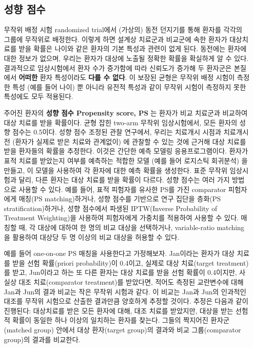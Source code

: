 \documentclass[11pt]{book}
\theoremstyle{definition}
\theoremstyle{definition}
\theoremstyle{definition}
\theoremstyle{remark}
\begin{document}
\subsection{성향 점수}\label{-}


무작위 배정 시험 randomized trial에서 (가상의) 동전 던지기를 통해 환자를
각각의 그룹에 무작위로 배정한다. 이렇게 하면 설계상 치료군과 비교군에
속한 환자가 대상치료를 받을 확률은 나이와 같은 환자의 기본 특성과 관련이
없게 된다. 동전에는 환자에 대한 정보가 없으며, 우리는 환자가 대상에
노출될 정확한 확률을 확실하게 알 수 있다. 결과적으로 임상시험에서 환자
수가 증가함에 따라 신뢰도가 증가해 두 환자군은 본질에서 \textbf{어떠한}
환자 특성이라도 \textbf{다를 수 없다}. 이 보장된 균형은 무작위 배정
시험이 측정한 특성 (예를 들어 나이) 뿐 아니라 유전적 특성과 같이 무작위
시험이 측정하지 못한 특성에도 모두 적용된다. 

주어진 환자의 \textbf{성향 점수 Propensity score, PS} 는 환자가 비교
치료군과 비교하여 대상 치료를 받을 확률이다. \citep{rosenbaum_1983} 균형
잡힌 two-arm 무작위 임상시험에서, 모든 환자의 성향 점수는 0.5이다. 성향
점수 조정된 관찰 연구에서, 우리는 치료개시 시점과 치료개시 전 (환자가
실제로 받은 치료와 관계없이) 에 관찰할 수 있는 것에 근거해 대상 치료를
받을 환자들의 확률을 추정한다. 이것은 간단한 예측 모델링
응용프로그램이다. 환자가 표적 치료를 받았는지 여부를 예측하는 적합한
모델 (예를 들어 로지스틱 회귀분석) 을 만들고, 이 모델을 사용하여 각
환자에 대한 예측 확률을 생성한다. 표준 무작위 임상시험과 달리, 다른
환자는 대상 치료를 받을 확률이 다르다. 성향 점수는 여러 가지 방법으로
사용할 수 있다. 예를 들어, 표적 피험자를 유사한 PS를 가진 comparator
피험자에게 매칭(PS matching)하거나, 성향 점수를 기반으로 연구 집단을
층화(PS stratification)하거나, 성향 점수에서 파생된 IPTW(Inverse
Probability of Treatment Weighting)을 사용하여 피험자에게 가중치를
적용하여 사용할 수 있다. 매칭할 때, 각 대상에 대하여 한 명의 비교 대상을
선택하거나, variable-ratio matching을 활용하여 대상당 두 명 이상의 비교
대상을 허용할 수 있다. \citep{rassen_2012} 

예를 들어 one-on-one PS 매칭을 사용한다고 가정해보자. Jan이라는 환자가
대상 치료를 받을 선험 확률(priori probability)이 0.4이고, 실제로 대상
치료(target treatment)를 받고, Jun이라고 하는 또 다른 환자는 대상 치료를
받을 선험 확률이 0.4이지만, 사실상 대조 치료(comparator treatment)를
받았다면, 적어도 측정된 교란변수에 대해 Jan과 Jun의 결과 비교는 작은
무작위 시험과 같다. 이 비교는 Jan과 Jun의 인과적인 대조를 무작위
시험으로 산출한 결과만큼 양호하게 추정할 것이다. 추정은 다음과 같이
진행된다: 대상치료를 받은 모든 환자에 대해, 대조 치료를 받았지만, 대상을
받는 선험적 확률이 동일한 하나 이상의 일치하는 환자를 찾는다. 그들의
짝지어진 환자군(matched group) 안에서 대상 환자(target group)의 결과와
비교 그룹(comparator group)의 결과를 비교한다.
\end{document}
